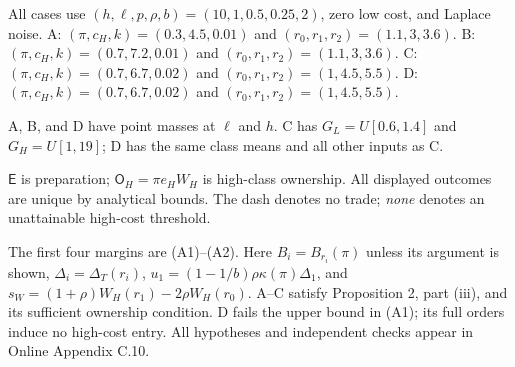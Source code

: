 \begin{table}[tbp]
\begin{threeparttable}
\begin{tablenotes}\footnotesize
\item All cases use $(h,\ell,p,\rho,b)=(10,1,0.5,0.25,2)$, zero low cost, and Laplace noise. A: $(\pi,c_H,k)=(0.3,4.5,0.01)$ and $(r_0,r_1,r_2)=(1.1,3,3.6)$. B: $(\pi,c_H,k)=(0.7,7.2,0.01)$ and $(r_0,r_1,r_2)=(1.1,3,3.6)$. C: $(\pi,c_H,k)=(0.7,6.7,0.02)$ and $(r_0,r_1,r_2)=(1,4.5,5.5)$. D: $(\pi,c_H,k)=(0.7,6.7,0.02)$ and $(r_0,r_1,r_2)=(1,4.5,5.5)$.
\item A, B, and D have point masses at $\ell$ and $h$. C has $G_L=U[0.6,1.4]$ and $G_H=U[1,19]$; D has the same class means and all other inputs as C.
\item $\mathsf E$ is preparation; $\mathsf O_H=\pi e_HW_H$ is high-class ownership. All displayed outcomes are unique by analytical bounds. The dash denotes no trade; \emph{none} denotes an unattainable high-cost threshold.
\item The first four margins are (A1)--(A2). Here $B_i=B_{r_i}(\pi)$ unless its argument is shown, $\Delta_i=\Delta_T(r_i)$, $u_1=(1-1/b)\rho\kappa(\pi)\Delta_1$, and $s_W=(1+\rho)W_H(r_1)-2\rho W_H(r_0)$. A--C satisfy Proposition 2, part (iii), and its sufficient ownership condition. D fails the upper bound in (A1); its full orders induce no high-cost entry. All hypotheses and independent checks appear in Online Appendix C.10.
\end{tablenotes}
\end{threeparttable}
\par\endgroup\end{table}
